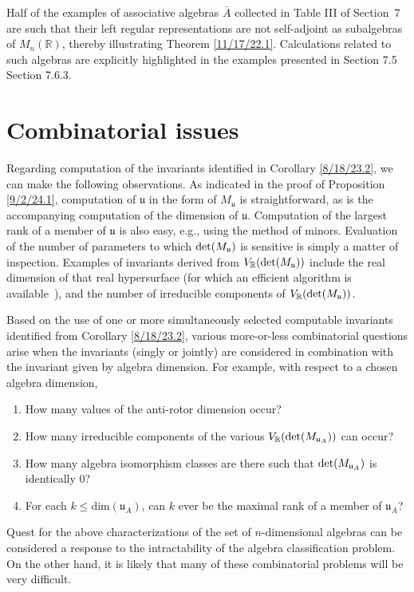 \documentclass{amsart}
\theoremstyle{definition}
\numberwithin{theorem}{section}
\numberwithin{equation}{section}
\begin{document}
 Half of the examples of associative algebras $\bar{A}$ collected in Table III of \mbox{Section 7} are such that their left regular representations are not self-adjoint as subalgebras of $M_n(\mathbb{R})$, thereby illustrating Theorem \ref{11/17/22.1}.  Calculations related to such algebras are explicitly highlighted in the examples presented in Section 7.5 Section 7.6.3.


  \section{Combinatorial issues}
Regarding computation of the invariants identified in Corollary \ref{8/18/23.2}, we can make the following observations.  As indicated in the proof of Proposition \ref{9/2/24.1}, computation of $\mathfrak{u}$ in the form of $M_\mathfrak{u}$ is straightforward, as is the accompanying computation of the dimension of $\mathfrak{u}$.   Computation of the largest rank of a member of $\mathfrak{u}$ is also easy, e.g., using the method of minors.   Evaluation of the number of parameters to which ${\rm det}(M_{\mathfrak{u}})$ is sensitive is simply a matter of inspection.  Examples of invariants derived from $V_\mathbb{R}({\rm det}(M_{\mathfrak{u}}))$ include the real dimension of that real hypersurface (for which an efficient algorithm is \mbox{available \cite{bannwarth:2015})}, and the number of irreducible components of $V_\mathbb{R}({\rm det}(M_{\mathfrak{u}}))$.  

 
Based on the use of one or more simultaneously selected computable invariants identified from Corollary \ref{8/18/23.2}, various more-or-less combinatorial questions arise when the invariants (singly or jointly) are considered in combination with the invariant given by algebra dimension.  For example, with respect to a chosen algebra dimension,  
\enlargethispage{1cm}
\begin{enumerate} \item How many values of the anti-rotor dimension occur?  \item How many irreducible components of the various $V_\mathbb{R}({\rm det}(M_{\mathfrak{u}_A}))$ can occur?  \item How many algebra isomorphism classes are there such that ${\rm det}(M_{\mathfrak{u}_A})$ is identically $0$?  \item For each $k\le \text{dim}(\mathfrak{u}_A)$, can $k$ ever be the maximal rank of a member of $\mathfrak{u}_A$?   \end{enumerate}  
 Quest for the above characterizations of the set of $n$-dimensional algebras can be considered a response to the intractability of the algebra classification problem.  On the other hand, it is likely that many of these combinatorial problems will be very difficult.
\end{document}
